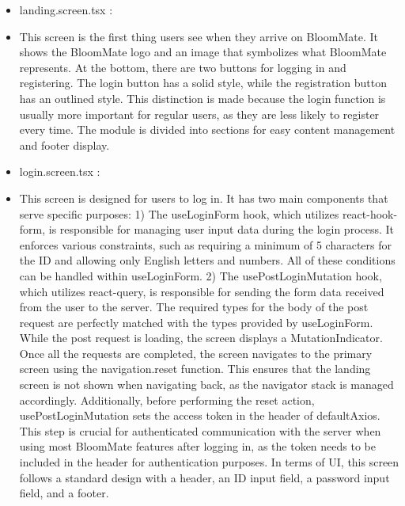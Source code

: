 \documentclass[conference, a4paper]{IEEEtran}
\begin{document}
\begin{enumerate}
\begin{enumerate}
\begin{itemize}
        \item landing.screen.tsx : 
        \item[] This screen is the first thing users see when they arrive on BloomMate. It shows the BloomMate logo and an image that symbolizes what BloomMate represents. At the bottom, there are two buttons for logging in and registering. The login button has a solid style, while the registration button has an outlined style. This distinction is made because the login function is usually more important for regular users, as they are less likely to register every time. The module is divided into sections for easy content management and footer display. \\

        \item login.screen.tsx :
        \item[] This screen is designed for users to log in. It has two main components that serve specific purposes: 1) The useLoginForm hook, which utilizes react-hook-form, is responsible for managing user input data during the login process. It enforces various constraints, such as requiring a minimum of 5 characters for the ID and allowing only English letters and numbers. All of these conditions can be handled within useLoginForm. 2) The usePostLoginMutation hook, which utilizes react-query, is responsible for sending the form data received from the user to the server. The required types for the body of the post request are perfectly matched with the types provided by useLoginForm. While the post request is loading, the screen displays a MutationIndicator. Once all the requests are completed, the screen navigates to the primary screen using the navigation.reset function. This ensures that the landing screen is not shown when navigating back, as the navigator stack is managed accordingly. Additionally, before performing the reset action, usePostLoginMutation sets the access token in the header of defaultAxios. This step is crucial for authenticated communication with the server when using most BloomMate features after logging in, as the token needs to be included in the header for authentication purposes. In terms of UI, this screen follows a standard design with a header, an ID input field, a password input field, and a footer. \\


\end{itemize}
\end{enumerate}
\end{enumerate}
\end{document}
